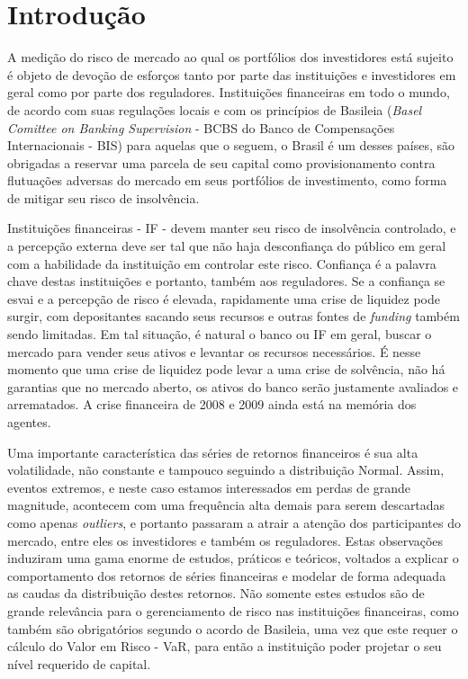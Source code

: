 \documentclass[review]{elsarticle}
\theoremstyle{definition}
\begin{document}
\linenumbers

\section{Introdução}

A medição do risco de mercado ao qual os portfólios dos investidores está sujeito é objeto de devoção de esforços tanto por parte das instituições e investidores em geral como por parte dos reguladores. Instituições financeiras em todo o mundo, de acordo com suas regulações locais e com os princípios de Basileia (\emph{Basel Comittee on Banking Supervision} - BCBS do Banco de Compensações Internacionais - BIS) para aquelas que o seguem, o Brasil é um desses países, são obrigadas a reservar uma parcela de seu capital como provisionamento contra flutuações adversas do mercado em seus portfólios de investimento, como forma de mitigar seu risco de insolvência.

Instituições financeiras - IF - devem manter seu risco de insolvência controlado, e a percepção externa deve ser tal que não haja desconfiança do público em geral com a habilidade da instituição em controlar este risco. Confiança é a palavra chave destas instituições e portanto, também aos reguladores. Se a confiança se esvai e a percepção de risco é elevada, rapidamente uma crise de liquidez pode surgir, com depositantes sacando seus recursos e outras fontes de \emph{funding} também sendo limitadas. Em tal situação, é natural o banco ou IF em geral, buscar o mercado para vender seus ativos e levantar os recursos necessários. É nesse momento que uma crise de liquidez pode levar a uma crise de solvência, não há garantias que no mercado aberto, os ativos do banco serão justamente avaliados e arrematados. A crise financeira de 2008 e 2009 ainda está na memória dos agentes.

Uma importante característica das séries de retornos financeiros é sua alta volatilidade, não constante e tampouco seguindo a distribuição Normal. Assim, eventos extremos, e neste caso estamos interessados em perdas de grande magnitude, acontecem com uma frequência alta demais para serem descartadas como apenas \emph{outliers}, e portanto passaram a atrair a atenção dos participantes do mercado, entre eles os investidores e também os reguladores. Estas observações induziram uma gama enorme de estudos, práticos e teóricos, voltados a explicar o comportamento dos retornos de séries financeiras e modelar de forma adequada as caudas da distribuição destes retornos. Não somente estes estudos são de grande relevância para o gerenciamento de risco nas instituições financeiras, como também são obrigatórios segundo o acordo de Basileia, uma vez que este requer o cálculo do Valor em Risco - VaR, para então a instituição poder projetar o seu nível requerido de capital. 
\end{document}
